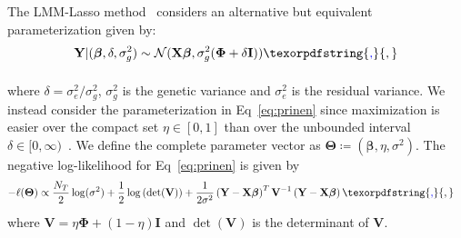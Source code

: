 \documentclass[10pt,letterpaper]{article}
\newcommand{\bX}{\textbf{X}}
\newcommand{\bY}{\textbf{Y}}
\newcommand{\bV}{\textbf{V}}
\newcommand{\bI}{\textbf{I}}
\newcommand{\bTheta}{\boldsymbol{\Theta}}
\newcommand{\bbeta}{\boldsymbol{\beta}}
\newcommand{\bPhi}{\boldsymbol{\Phi}}
\providecommand{\DIFaddtex}[1]{{\protect\color{blue}\uwave{#1}}} %
\providecommand{\DIFaddbegin}{} %
\providecommand{\DIFaddend}{} %
\providecommand{\DIFadd}[1]{\texorpdfstring{\DIFaddtex{#1}}{#1}} %
\newcommand{\DIFaddincludegraphics}[2][]{{\color{blue}\fbox{\DIFOincludegraphics[#1]{#2}}}} %
\DeclareRobustCommand{\DIFaddbegin}{\DIFOaddbegin \let\includegraphics\DIFaddincludegraphics} %
\DeclareRobustCommand{\DIFaddend}{\DIFOaddend \let\includegraphics\DIFOincludegraphics} %
\begin{document}
The LMM-Lasso method~\cite{rakitsch2013lasso} considers an alternative but equivalent parameterization given by:
\begin{equation}
\bY | (\bbeta, \delta, \sigma_g^2) \sim \mathcal{N}(\bX \bbeta, \sigma_g^2(\bPhi + \delta\bI)) \label{eq:lippert}\DIFaddbegin \DIFadd{,
}\DIFaddend \end{equation}

where $\delta = \sigma^2_e / \sigma^2_g$, $\sigma^2_g$ is the genetic variance and $\sigma^2_e$ is the residual variance. We instead consider the parameterization in Eq~\ref{eq:prinen} since maximization is easier over the compact set $\eta \in [0,1]$ than over the unbounded interval $\delta \in [0, \infty)$~\cite{pirinen2013efficient}. We define the complete parameter vector as $\bTheta \coloneqq \left(\bbeta, \eta, \sigma^2 \right)$. The negative log-likelihood for Eq~\ref{eq:prinen} is given by
\begin{align}
-\ell(\bTheta) & \propto \frac{N_T}{2}\log(\sigma^2) + \frac{1}{2}\log\left(\det(\bV)\right) + \frac{1}{2\sigma^2} \left(\bY - \bX \bbeta\right)^T \bV^{-1} \left(\bY - \bX \bbeta\right)  \label{eq:LogLike}\DIFaddbegin \DIFadd{,
}\DIFaddend \end{align}
where $\bV = \eta \bPhi + (1-\eta) \bI$ and $\det(\bV)$ is the determinant of $\bV$.
\end{document}
